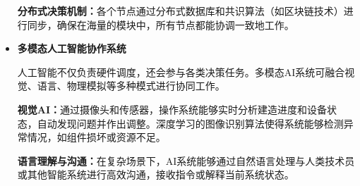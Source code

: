 \documentclass[UTF8]{homework}
\begin{document}
\begin{homeworkProblem}
\begin{itemize}
	\textbf{分布式决策机制：}各个节点通过分布式数据库和共识算法（如区块链技术）进行同步，确保在海量的模块中，所有节点都能协调一致地工作。\\
	
	\item \textbf{多模态人工智能协作系统}
	
	人工智能不仅负责硬件调度，还会参与各类决策任务。多模态AI系统可融合视觉、语言、物理模拟等多种模式进行协同工作。
	
	\textbf{视觉AI：}通过摄像头和传感器，操作系统能够实时分析建造进度和设备状态，自动发现问题并作出调整。深度学习的图像识别算法使得系统能够检测异常情况，如组件损坏或资源不足。
	
	\textbf{语言理解与沟通：}在复杂场景下，AI系统能够通过自然语言处理与人类技术员或其他智能系统进行高效沟通，接收指令或解释当前系统状态。\\
	
\end{itemize}

\end{homeworkProblem}



%
%
% 
% 
\end{document}
